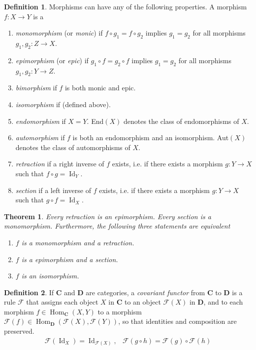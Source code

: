 \documentclass{article}
\DeclareMathOperator{\Id}{Id}
\DeclareMathOperator{\Hom}{Hom}
\newtheorem{theorem}{Theorem}[section]
\theoremstyle{remark}
\theoremstyle{definition}
\newtheorem{definition}{Definition}[section]
\begin{document}
\begin{definition}
Morphisms can have any of the following properties. A morphism $f: X \longrightarrow Y$ is a
\begin{enumerate}
    \item \textit{monomorphism} (or \textit{monic}) if $f \circ g_1 = f \circ g_2$ implies $g_1 = g_2$ for all morphisms $g_1, g_2: Z \longrightarrow X$. 
    \item \textit{epimorphism} (or \textit{epic}) if $g_1 \circ f = g_2 \circ f$ implies $g_1 = g_2$ for all morphisms $g_1, g_2: Y \longrightarrow Z$. 
    \item \textit{bimorphism} if $f$ is both monic and epic. 
    \item \textit{isomorphism} if (defined above). 
    \item \textit{endomorphism} if $X = Y$. End$(X)$ denotes the class of endomorphisms of $X$. 
    \item \textit{automorphism} if $f$ is both an endomorphism and an isomorphism. Aut$(X)$ denotes the class of automorphisms of $X$. 
    \item \textit{retraction} if a right inverse of $f$ exists, i.e. if there exists a morphism $g: Y \longrightarrow X$ such that $f \circ g = \Id_Y$. 
    \item \textit{section} if a left inverse of $f$ exists, i.e. if there exists a morphism $g: Y \longrightarrow X$ such that $g \circ f = \Id_X$. 
\end{enumerate}
\end{definition}

\begin{theorem}
Every retraction is an epimorphism. Every section is a monomorphism. Furthermore, the following three statements are equivalent
\begin{enumerate}
    \item $f$ is a monomorphism and a retraction. 
    \item $f$ is a epimorphism and a section. 
    \item $f$ is an isomorphism. 
\end{enumerate}
\end{theorem}

\begin{definition}
If $\mathbf{C}$ and $\mathbf{D}$ are categories, a \textit{covariant functor} from $\mathbf{C}$ to $\mathbf{D}$ is a rule $\mathcal{F}$ that assigns each object $X$ in $\mathbf{C}$ to an object $\mathcal{F}(X)$ in $\mathbf{D}$, and to each morphism $f \in \Hom_\mathbf{C} (X ,Y)$ to a morphism $\mathcal{F}(f) \in \Hom_\mathbf{D} (\mathcal{F}(X), \mathcal{F}(Y))$, so that identities and composition are preserved.
\begin{align*}
    \mathcal{F}(\Id_X) = \Id_{\mathcal{F}(X)}, & \mathcal{F}(g \circ h) = \mathcal{F}(g) \circ \mathcal{F} (h)
\end{align*}
\end{definition}
\end{document}
